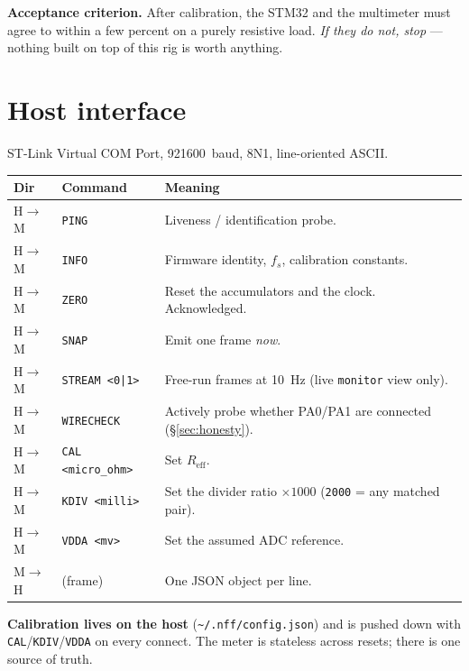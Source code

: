 \documentclass[11pt,a4paper]{article}
\begin{document}
\medskip
\noindent
\textbf{Acceptance criterion.} After calibration, the STM32 and the multimeter must agree to
within a few percent on a purely resistive load. \emph{If they do not, stop} --- nothing built
on top of this rig is worth anything.

\section{Host interface}

ST-Link Virtual COM Port, \SI{921600}{baud}, 8N1, line-oriented ASCII.

\begin{center}
\begin{tabularx}{\textwidth}{llX}
\toprule
\textbf{Dir} & \textbf{Command} & \textbf{Meaning} \\
\midrule
H$\rightarrow$M & \texttt{PING}                    & Liveness / identification probe. \\
H$\rightarrow$M & \texttt{INFO}                    & Firmware identity, $f_s$, calibration constants. \\
H$\rightarrow$M & \texttt{ZERO}                    & Reset the accumulators and the clock. Acknowledged. \\
H$\rightarrow$M & \texttt{SNAP}                    & Emit one frame \emph{now}. \\
H$\rightarrow$M & \texttt{STREAM <0|1>}            & Free-run frames at \SI{10}{\hertz} (live \texttt{monitor} view only). \\
H$\rightarrow$M & \texttt{WIRECHECK}               & Actively probe whether PA0/PA1 are connected (\S\ref{sec:honesty}). \\
H$\rightarrow$M & \texttt{CAL <micro\_ohm>}        & Set $R_\text{eff}$. \\
H$\rightarrow$M & \texttt{KDIV <milli>}            & Set the divider ratio $\times 1000$ (\texttt{2000} = any matched pair). \\
H$\rightarrow$M & \texttt{VDDA <mv>}               & Set the assumed ADC reference. \\
M$\rightarrow$H & (frame)                          & One JSON object per line. \\
\bottomrule
\end{tabularx}
\end{center}

\noindent
\textbf{Calibration lives on the host} (\texttt{\textasciitilde/.nff/config.json}) and is pushed
down with \texttt{CAL}/\texttt{KDIV}/\texttt{VDDA} on every connect. The meter is stateless across
resets; there is one source of truth.
\end{document}
